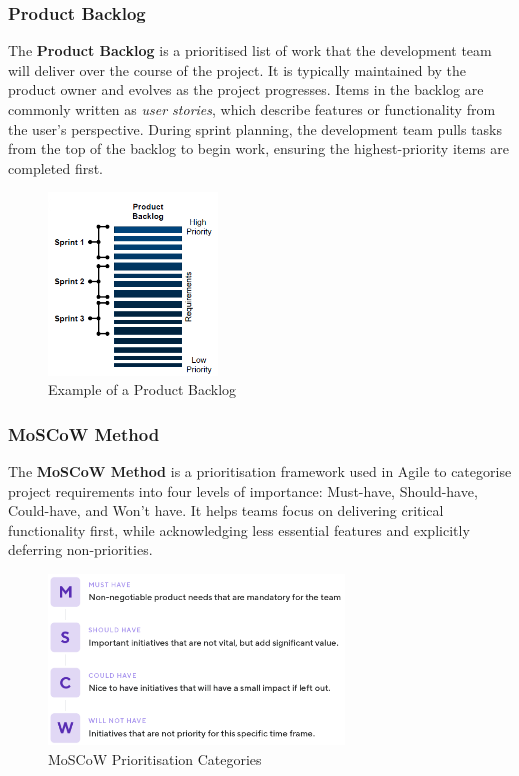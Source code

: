\documentclass{article}
\begin{document}
\subsubsection{Product Backlog}

The \textbf{Product Backlog} is a prioritised list of work that the development team will deliver over the course of the project. It is typically maintained by the product owner and evolves as the project progresses. Items in the backlog are commonly written as \textit{user stories}, which describe features or functionality from the user's perspective. During sprint planning, the development team pulls tasks from the top of the backlog to begin work, ensuring the highest-priority items are completed first.

\begin{figure}[h]
    \centering
    \includegraphics[width=0.4\textwidth]{backlog.png}
    \caption{Example of a Product Backlog}
    \label{fig:product-backlog}
\end{figure}

\subsubsection{MoSCoW Method}

The \textbf{MoSCoW Method} is a prioritisation framework used in Agile to categorise project requirements into four levels of importance: Must-have, Should-have, Could-have, and Won’t have. It helps teams focus on delivering critical functionality first, while acknowledging less essential features and explicitly deferring non-priorities.

\begin{figure}[h]
    \centering
    \includegraphics[width=0.7\textwidth]{moscow.png}
    \caption{MoSCoW Prioritisation Categories}
    \label{fig:moscow}
\end{figure}
\end{document}
